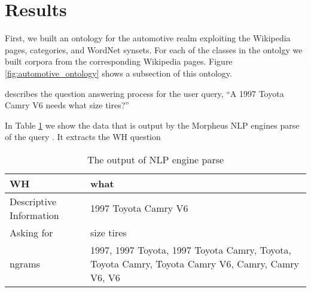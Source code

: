 \section{Results}
\label{sec:results}


First, we built an ontology for the automotive realm exploiting the Wikipedia pages, categories, and WordNet synsets. For each of the classes in the ontolgy we built corpora from the corresponding Wikipedia pages. Figure \ref{fig:automotive_ontology} shows a subsection of this ontology.

 describes the question answering process for the user query, ``A 1997 Toyota Camry V6 needs what size tires?''


In Table \ref{tbl:nlp_engine_parse} we show the data that is output by the Morpheus NLP engines parse of the query .  It extracts the WH question


\begin{table}[h]\footnotesize
	\begin{tabular}{|l|p{4.2cm}|}
		\hline 
		WH & what \\
		\hline 
		Descriptive Information & 1997 Toyota Camry V6 \\
		\hline 
		Asking for & size tires \\
		\hline 
		ngrams & 1997, 1997 Toyota, 1997 Toyota Camry, Toyota, Toyota Camry, Toyota Camry V6, Camry, Camry V6, V6 \\
		\hline
	\end{tabular}
	\caption{The output of NLP engine parse}
	\label{tbl:nlp_engine_parse} 
\end{table}

